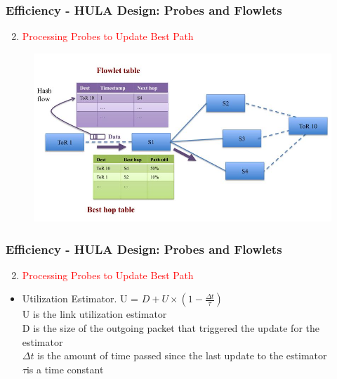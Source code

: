 \documentclass{beamer}
\begin{document}
\begin{frame}
	\frametitle{Efficiency - HULA Design: Probes and Flowlets}
	\begin{enumerate}
		\setcounter{enumi}{1}
		\item\textcolor{red}{Processing Probes to Update Best Path}\\
	\end{enumerate}
	\begin{figure}
		\includegraphics[width=1\linewidth]{13}
	\end{figure}
\end{frame}

\begin{frame}
	\frametitle{Efficiency - HULA Design: Probes and Flowlets}
	\begin{enumerate}
		\setcounter{enumi}{1}
		\item\textcolor{red}{Processing Probes to Update Best Path}\\
	\end{enumerate}
	\begin{itemize}
		\item Utilization Estimator. U = ${ D + U \times (1 - \frac{\Delta t}{\tau})}$ \\
		U is the link utilization estimator \\
		D is the size of the outgoing packet that triggered the update for the estimator\\
		${\Delta t}$ is the amount of time passed since the last update to the estimator\\
		${\tau}$is a time constant
	\end{itemize}
\end{frame}

\end{document}

